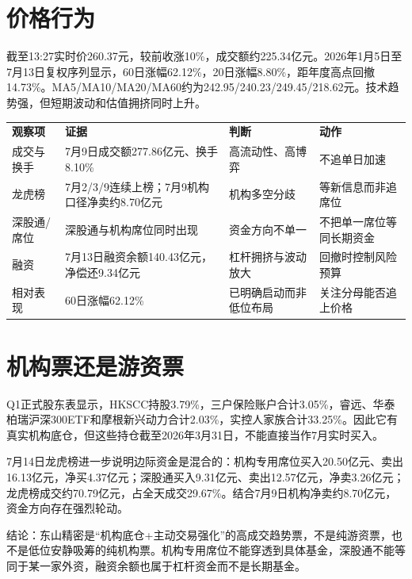 
\section{价格行为}
截至13:27实时价260.37元，较前收涨10\%，成交额约225.34亿元。2026年1月5日至7月13日复权序列显示，60日涨幅62.12\%，20日涨幅8.80\%，距年度高点回撤14.73\%。MA5/MA10/MA20/MA60约为242.95/240.23/249.45/218.62元。技术趋势强，但短期波动和估值拥挤同时上升。

\begin{exhibitbox}
\begin{tabularx}{\exhibitboxwidth}{L{3.2cm}X L{3.0cm}X}
\textbf{观察项} & \textbf{证据} & \textbf{判断} & \textbf{动作} \\
成交与换手 & 7月9日成交额277.86亿元、换手8.10\% & 高流动性、高博弈 & 不追单日加速 \\
龙虎榜 & 7月2/3/9连续上榜；7月9机构口径净卖约8.70亿元 & 机构多空分歧 & 等新信息而非追席位 \\
深股通/席位 & 深股通与机构席位同时出现 & 资金方向不单一 & 不把单一席位等同长期资金 \\
融资 & 7月13日融资余额140.43亿元，净偿还9.34亿元 & 杠杆拥挤与波动放大 & 回撤时控制风险预算 \\
相对表现 & 60日涨幅62.12\% & 已明确启动而非低位布局 & 关注分母能否追上价格 \\
\end{tabularx}
\end{exhibitbox}

\section{机构票还是游资票}
Q1正式股东表显示，HKSCC持股3.79\%，三户保险账户合计3.05\%，睿远、华泰柏瑞沪深300ETF和摩根新兴动力合计2.03\%，实控人家族合计33.25\%。因此它有真实机构底仓，但这些持仓截至2026年3月31日，不能直接当作7月实时买入。

7月14日龙虎榜进一步说明边际资金是混合的：机构专用席位买入20.50亿元、卖出16.13亿元，净买4.37亿元；深股通买入9.31亿元、卖出12.57亿元，净卖3.26亿元；龙虎榜成交约70.79亿元，占全天成交29.67\%。结合7月9日机构净卖约8.70亿元，资金方向存在强烈轮动。

结论：东山精密是“机构底仓+主动交易强化”的高成交趋势票，不是纯游资票，也不是低位安静吸筹的纯机构票。机构专用席位不能穿透到具体基金，深股通不能等同于某一家外资，融资余额也属于杠杆资金而不是长期基金。

